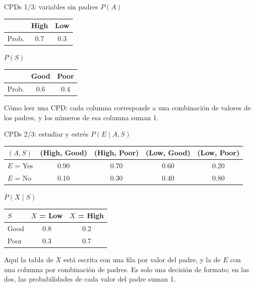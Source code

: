 \documentclass[11pt]{beamer}
\newcommand{\Pp}[1]{P\!\left(#1\right)}
\begin{document}
\begin{frame}{CPDs 1/3: variables sin padres}
  \small
  \textbf{$\Pp{A}$}\\[0.1cm]
  \begin{tabular}{lcc}
    \toprule
    & High & Low \\
    \midrule
    Prob. & 0.7 & 0.3 \\
    \bottomrule
  \end{tabular}

  \vspace{0.3cm}
  \textbf{$\Pp{S}$}\\[0.1cm]
  \begin{tabular}{lcc}
    \toprule
    & Good & Poor \\
    \midrule
    Prob. & 0.6 & 0.4 \\
    \bottomrule
  \end{tabular}

  \vspace{0.4cm}
  \normalsize
  Cómo leer una CPD: cada columna corresponde a una combinación de valores de los padres, y los números de esa columna suman 1.
\end{frame}

\begin{frame}{CPDs 2/3: estudiar y estrés}
  \small
  \textbf{$\Pp{E\mid A,S}$}\\[0.1cm]
  \begin{tabular}{lcccc}
    \toprule
    $(A,S)$ & (High, Good) & (High, Poor) & (Low, Good) & (Low, Poor) \\
    \midrule
    $E$ = Yes & 0.90 & 0.70 & 0.60 & 0.20 \\
    $E$ = No  & 0.10 & 0.30 & 0.40 & 0.80 \\
    \bottomrule
  \end{tabular}

  \vspace{0.4cm}
  \textbf{$\Pp{X\mid S}$}\\[0.1cm]
  \begin{tabular}{lcc}
    \toprule
    $S$ & $X$ = Low & $X$ = High \\
    \midrule
    Good & 0.8 & 0.2 \\
    Poor & 0.3 & 0.7 \\
    \bottomrule
  \end{tabular}

  \vspace{0.3cm}
  \normalsize
  Aquí la tabla de $X$ está escrita con una fila por valor del padre, y la de $E$ con una columna por combinación de padres. Es solo una decisión de formato; en las dos, las probabilidades de cada valor del padre suman 1.
\end{frame}
\end{document}
